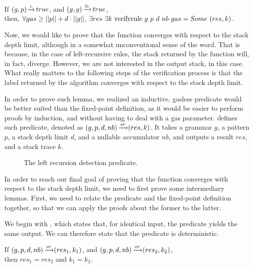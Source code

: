 \begin{lemma}%
    If $(g,p) \operatorname{\xrightarrow{\mathit{c}}} true$,
    and $(g,g) \operatorname{\xrightarrow{\mathit{lc}}} true$, \\
    then, $\forall gas \ge ||p|| + d \cdot ||g||$,
    $\exists res\ \exists k\ \verifyrulecomp{g}{p}{d}{nb}{gas} = \Some (res, k)$.
    \label{lemma:vr-termination}
\end{lemma}

Now, we would like to
prove that the function
converges with respect to the
stack depth limit,
although in a somewhat unconventional
sense of the word.
That is because,
in the case of left-recursive rules,
the stack returned by the function will,
in fact,
diverge.
However, we are not interested in
the output stack, in this case.
What really matters to the following
steps of the verification process
is that the label returned by the algorithm converges
with respect to the stack depth limit.

In order to prove such lemma,
we realized an inductive, gasless predicate
would be better suited
than the fixed-point definition,
as it would be easier to perform proofs by induction,
and without having to deal with a gas parameter.
defines such predicate,
denoted as $(g,p,d,nb) \operatorname{\xrightarrow{\mathit{vr}}} (res,k)$.
It takes a grammar $g$,
a pattern $p$,
a stack depth limit $d$,
and a nullable accumulator $nb$,
and outputs a result $res$,
and a stack trace $k$.

\begin{figure}
    
    \caption{The left recursion detection predicate.}
    \label{fig:verifyrule}
\end{figure}

In order to reach our final goal
of proving that the function converges
with respect to the stack depth limit,
we need to first prove some intermediary lemmas.
First, we need to relate the predicate and
the fixed-point definition together,
so that we can apply the proofs about the
former to the latter.

We begin with
,
which states that,
for identical input,
the predicate yields the same output.
We can therefore state
that the predicate is deterministic.

\begin{lemma}
    If $(g,p,d,nb) \operatorname{\xrightarrow{\mathit{vr}}} (res_1,k_1)$,
    and $(g,p,d,nb) \operatorname{\xrightarrow{\mathit{vr}}} (res_2,k_2)$, \\
    then $res_1 = res_2$ and $k_1 = k_2$.
    \label{lemma:vr-determinism}
\end{lemma}

